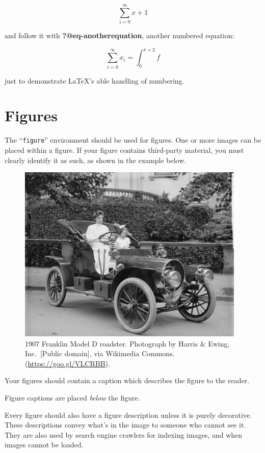 \documentclass[
  letterpaper,
  DIV=11,
  numbers=noendperiod]{scrartcl}
\begin{document}
\[\sum_{i=0}^{\infty} x + 1\]

and follow it with \textbf{?@eq-anotherequation}, another numbered
equation:

\[
\sum_{i=0}^{\infty}x_i=\int_{0}^{\pi+2} f
\]

just to demonstrate \LaTeX's able handling of numbering.

\hypertarget{figures}{%
\section{Figures}\label{figures}}

The ``\texttt{figure}'' environment should be used for figures. One or
more images can be placed within a figure. If your figure contains
third-party material, you must clearly identify it as such, as shown in
the example below.

\begin{figure}

{\centering \includegraphics{sample-franklin.png}

}

\caption{\label{fig-dresses}1907 Franklin Model D roadster. Photograph
by Harris \& Ewing, Inc.~{[}Public domain{]}, via Wikimedia Commons.
(\url{https://goo.gl/VLCRBB}).}

\end{figure}

Your figures should contain a caption which describes the figure to the
reader.

Figure captions are placed \emph{below} the figure.

Every figure should also have a figure description unless it is purely
decorative. These descriptions convey what's in the image to someone who
cannot see it. They are also used by search engine crawlers for indexing
images, and when images cannot be loaded.
\end{document}
